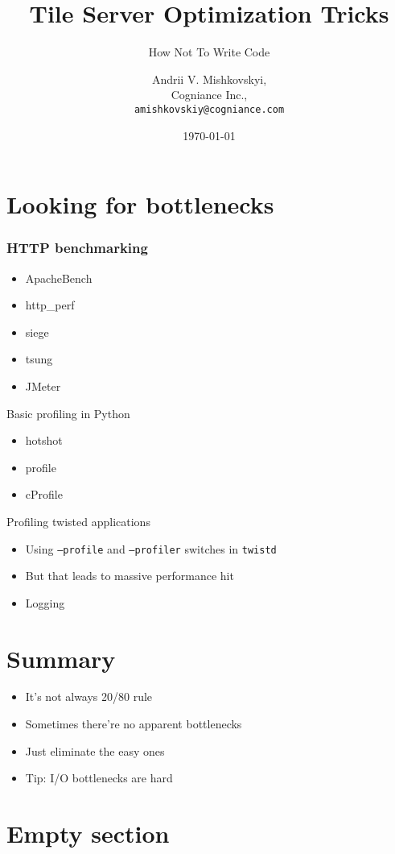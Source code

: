 \documentclass[16pt]{beamer}
\title{Tile Server Optimization Tricks}
\subtitle{How Not To Write Code}
\author{Andrii V. Mishkovskyi,\\
  Cogniance Inc.,\\
  \texttt{amishkovskiy@cogniance.com}}
\date{\today}
\begin{document}
\begin{frame}
  \titlepage
\end{frame}

\begin{frame}
  \tableofcontents
\end{frame}

\section{Looking for bottlenecks}

\begin{frame}
  \frametitle{HTTP benchmarking}
  \begin{itemize}
  \item ApacheBench
  \item http\_perf
  \item siege
  \item tsung
  \item JMeter
  \end{itemize}
\end{frame}

\begin{frame}{Basic profiling in Python}
  \begin{itemize}
  \item hotshot
  \item profile
  \item cProfile
  \end{itemize}
\end{frame}

\begin{frame}{Profiling twisted applications}
  \begin{itemize}
  \item Using \texttt{--profile} and \texttt{--profiler}
    switches in \texttt{twistd}
  \item But that leads to massive performance hit
  \item Logging
  \end{itemize}
\end{frame}

\section*{Summary}

\begin{frame}{}
  \begin{itemize}
  \item It's not always 20/80 rule
  \item Sometimes there're no apparent bottlenecks
  \item Just eliminate the easy ones
  \item Tip: I/O bottlenecks are hard
  \end{itemize}
\end{frame}

\section{Empty section}
\end{document}
